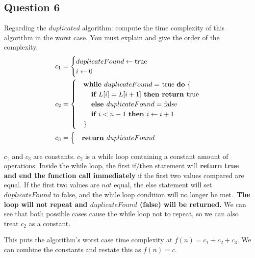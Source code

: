 \documentclass[12pt]{article}
\begin{document}
    \subsection*{Question 6}
        Regarding the $duplicated$ algorithm: compute the time complexity of this algorithm in the worst case. You must explain and give the order of the complexity.
        \begin{align*}
            &c_1=
            \begin{cases}
            \textbf{$duplicateFound$} \leftarrow{} \text{true}\\
            \textbf{$i \leftarrow{} 0$}\\
            \end{cases}\\
            &c_2=
            \begin{cases}
            &\textbf{while $duplicateFound =$ \normalfont{true} \textbf{do} \{}\\
            &\textbf{\hspace*{4mm}if $L[i]=L[i+1]$ then return \normalfont{true}}\\
            &\textbf{\hspace*{4mm}else $duplicateFound = $\normalfont{ false}}\\
            &\textbf{\hspace*{4mm}if $i<n-1$ then $i \leftarrow{} i+1$}\\
            &\text{\}}\\
            \end{cases}\\
            &c_3=
            \begin{cases}
            &\textbf{return $duplicateFound$}
            \end{cases}
        \end{align*}

        $c_1$ and $c_3$ are constants. $c_2$ is a while loop containing a constant amount of operations. Inside the while loop, the first if/then statement will \textbf{return true and end the function call immediately} if the first two values compared are equal. If the first two values are $not$ equal, the else statement will set $duplicateFound$ to false, and the while loop condition will no longer be met.\ \textbf{The loop will not repeat and $duplicateFound$ (false) will be returned.} We can see that both possible cases cause the while loop not to repeat, so we can also treat $c_2$ as a constant.

        This puts the algorithm's worst case time complexity at $f(n) = c_1+c_2+c_3$. We can combine the constants and restate this as $f(n) = c$.
        
\end{document}
